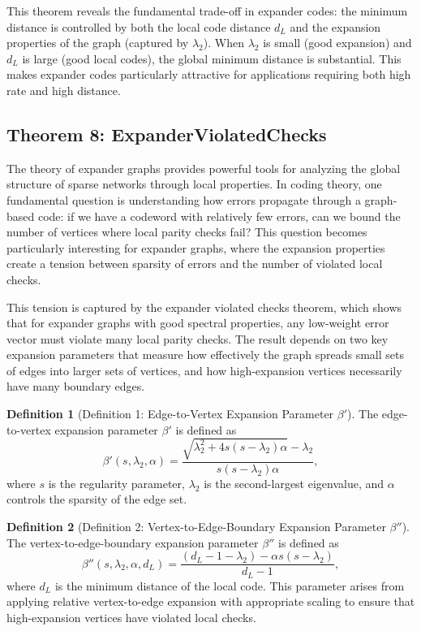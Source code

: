 \documentclass[11pt]{article}
\theoremstyle{plain}
\theoremstyle{definition}
\newtheorem*{definition}{Definition}
\theoremstyle{remark}
\begin{document}
This theorem reveals the fundamental trade-off in expander codes: the minimum distance is controlled by both the local code distance $d_L$ and the expansion properties of the graph (captured by $\lambda_2$). When $\lambda_2$ is small (good expansion) and $d_L$ is large (good local codes), the global minimum distance is substantial. This makes expander codes particularly attractive for applications requiring both high rate and high distance.

\vspace{1em}

\subsection{Theorem 8: ExpanderViolatedChecks}

The theory of expander graphs provides powerful tools for analyzing the global structure of sparse networks through local properties. In coding theory, one fundamental question is understanding how errors propagate through a graph-based code: if we have a codeword with relatively few errors, can we bound the number of vertices where local parity checks fail? This question becomes particularly interesting for expander graphs, where the expansion properties create a tension between sparsity of errors and the number of violated local checks.

This tension is captured by the expander violated checks theorem, which shows that for expander graphs with good spectral properties, any low-weight error vector must violate many local parity checks. The result depends on two key expansion parameters that measure how effectively the graph spreads small sets of edges into larger sets of vertices, and how high-expansion vertices necessarily have many boundary edges.

\begin{definition}[Definition 1: Edge-to-Vertex Expansion Parameter $\beta'$]
The edge-to-vertex expansion parameter $\beta'$ is defined as
\[
\beta'(s, \lambda_2, \alpha) = \frac{\sqrt{\lambda_2^2 + 4s(s - \lambda_2)\alpha} - \lambda_2}{s(s - \lambda_2)\alpha},
\]
where $s$ is the regularity parameter, $\lambda_2$ is the second-largest eigenvalue, and $\alpha$ controls the sparsity of the edge set.
\end{definition}

\begin{definition}[Definition 2: Vertex-to-Edge-Boundary Expansion Parameter $\beta''$]
The vertex-to-edge-boundary expansion parameter $\beta''$ is defined as
\[
\beta''(s, \lambda_2, \alpha, d_L) = \frac{(d_L - 1 - \lambda_2) - \alpha s(s - \lambda_2)}{d_L - 1},
\]
where $d_L$ is the minimum distance of the local code. This parameter arises from applying relative vertex-to-edge expansion with appropriate scaling to ensure that high-expansion vertices have violated local checks.
\end{definition}
\end{document}
